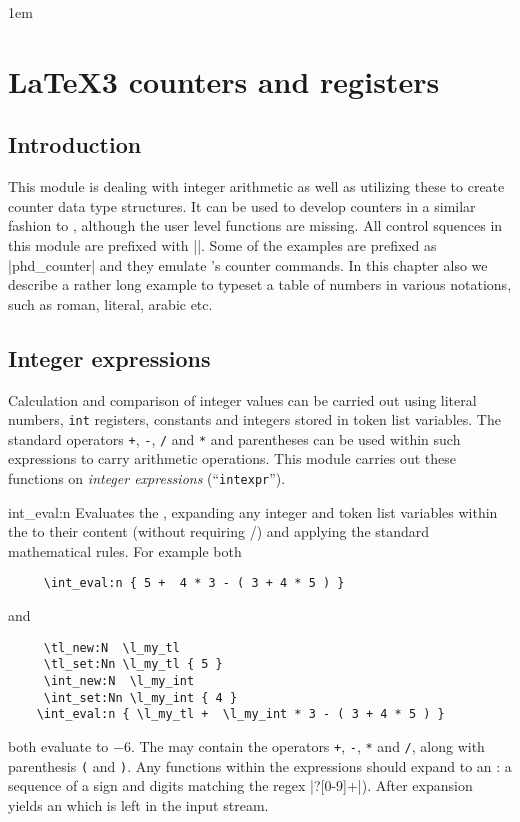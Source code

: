 \parindent1em
\chapter{LaTeX3 counters and registers}

 \section{Introduction}
 
 This  module is dealing with integer arithmetic as well as utilizing these to create counter data type structures. It can be used to develop counters in a similar fashion to \latexe, although the user level functions are missing.  All control squences in this module are prefixed with |\int|. Some of the examples are prefixed as |phd_counter| and they emulate \latex’s counter commands. In this chapter also we describe a rather long example to typeset a table of numbers in various notations, such as roman, literal, arabic etc.
 
 \section{Integer expressions}

 Calculation and comparison of integer values can be carried out
 using literal numbers, \texttt{int} registers, constants and
 integers stored in token list variables. The standard operators
 \texttt{+}, \texttt{-}, \texttt{/} and \texttt{*} and
 parentheses can be used within such expressions to carry
 arithmetic operations. This module carries out these functions
 on \emph{integer expressions} (\enquote{\texttt{intexpr}}).

 \begin{docCommand}{int_eval:n} {}
    Evaluates the , expanding any
   integer and token list variables within the 
   to their content (without requiring /)
   and applying the standard mathematical rules. For example both
 \end{docCommand}
   
   \begin{verbatim}
     \int_eval:n { 5 +  4 * 3 - ( 3 + 4 * 5 ) }
   \end{verbatim}
   and
   \begin{verbatim}
     \tl_new:N  \l_my_tl
     \tl_set:Nn \l_my_tl { 5 }
     \int_new:N  \l_my_int
     \int_set:Nn \l_my_int { 4 }
    \int_eval:n { \l_my_tl +  \l_my_int * 3 - ( 3 + 4 * 5 ) }
   \end{verbatim}
   both evaluate to \( -6 \). The   may
   contain the operators \texttt{+}, \texttt{-}, \texttt{*} and
   \texttt{/}, along with parenthesis \texttt{(} and \texttt{)}.
   Any functions within the expressions should expand to an
   : a sequence of a sign and digits matching
   the regex |\-?[0-9]+|).
   After expansion  yields an  
   which is left in the input stream.
 
